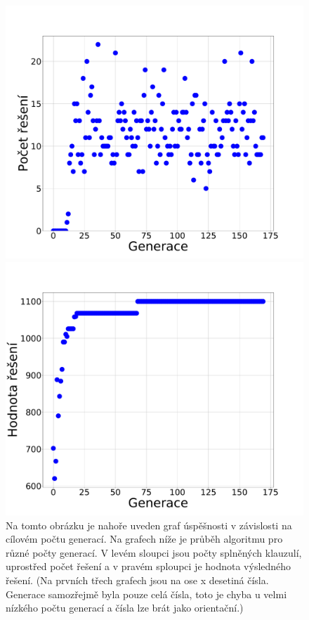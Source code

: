 \documentclass[11pt]{article}
\begin{document}
\begin{figure}
\begin{minipage}[c]{0.325\textwidth}
        \centering \includegraphics[width=\textwidth]{img/gc3s.pdf} 
    \end{minipage}
    \begin{minipage}[c]{0.325\textwidth}
        \centering \includegraphics[width=\textwidth]{img/gc3w.pdf} 
    \end{minipage}
   \caption{Na tomto obrázku je nahoře uveden graf úspěšnosti v závislosti na cílovém počtu generací. Na grafech níže je průběh algoritmu pro různé počty generací. V levém sloupci jsou počty splněných klauzulí, uprostřed počet řešení a v pravém sploupci je hodnota výsledného řešení. (Na prvních třech grafech jsou na ose x desetiná čísla. Generace samozřejmě byla pouze celá čísla, toto je chyba u velmi nízkého počtu generací a čísla lze brát jako orientační.)}\label{fig:gencount}
\end{figure} 
\end{document}
